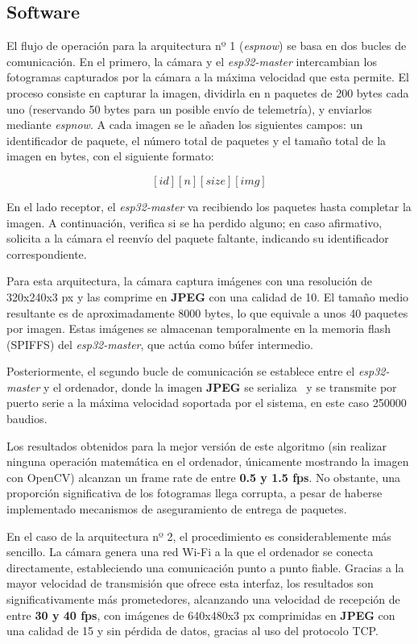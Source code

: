       \subsection{Software}



El flujo de operación para la arquitectura nº 1 (\textit{espnow}) se basa en dos bucles de comunicación. En el primero, la cámara y el \textit{esp32-master} intercambian los fotogramas capturados por la cámara a la máxima velocidad que esta permite. El proceso consiste en capturar la imagen, dividirla en n paquetes de 200 bytes cada uno (reservando 50 bytes para un posible envío de telemetría), y enviarlos mediante \textit{espnow}. A cada imagen se le añaden los siguientes campos: un identificador de paquete, el número total de paquetes y el tamaño total de la imagen en bytes, con el siguiente formato:

\textbf{$$[id][n][size][img]$$}

En el lado receptor, el \textit{esp32-master} va recibiendo los paquetes hasta completar la imagen. A continuación, verifica si se ha perdido alguno; en caso afirmativo, solicita a la cámara el reenvío del paquete faltante, indicando su identificador correspondiente.

Para esta arquitectura, la cámara captura imágenes con una resolución de 320x240x3 px y las comprime en \textbf{JPEG} con una calidad de 10. El tamaño medio resultante es de aproximadamente 8000 bytes, lo que equivale a unos 40 paquetes por imagen. Estas imágenes se almacenan temporalmente en la memoria flash (SPIFFS) del \textit{esp32-master}, que actúa como búfer intermedio.

Posteriormente, el segundo bucle de comunicación se establece entre el \textit{esp32-master} y el ordenador, donde la imagen \textbf{JPEG} se serializa~\cite{serialib_repo} y se transmite por puerto serie a la máxima velocidad soportada por el sistema, en este caso 250000 baudios.

Los resultados obtenidos para la mejor versión de este algoritmo (sin realizar ninguna operación matemática en el ordenador, únicamente mostrando la imagen con OpenCV) alcanzan un frame rate de entre \textbf{0.5 y 1.5 fps}. No obstante, una proporción significativa de los fotogramas llega corrupta, a pesar de haberse implementado mecanismos de aseguramiento de entrega de paquetes.

En el caso de la arquitectura nº 2, el procedimiento es considerablemente más sencillo. La cámara genera una red Wi-Fi a la que el ordenador se conecta directamente, estableciendo una comunicación punto a punto fiable. Gracias a la mayor velocidad de transmisión que ofrece esta interfaz, los resultados son significativamente más prometedores, alcanzando una velocidad de recepción de entre \textbf{30 y 40 fps}, con imágenes de 640x480x3 px comprimidas en \textbf{JPEG} con una calidad de 15 y sin pérdida de datos, gracias al uso del protocolo TCP.

